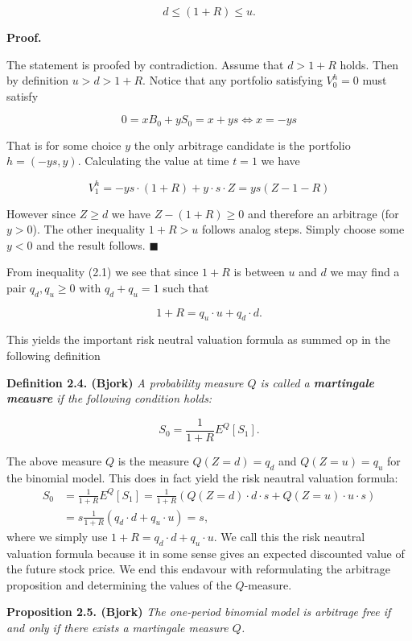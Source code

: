 \documentclass[
]{book}
\begin{document}
\[d\le (1+R)\le u.\tag{2.1}\]

\noindent\makebox[\linewidth]{\rule{\textwidth}{0.4pt}}

\textbf{Proof.}

The statement is proofed by contradiction. Assume that \(d>1+R\) holds. Then by definition \(u>d>1+R\). Notice that any portfolio satisfying \(V_0^h=0\) must satisfy

\[0=xB_0+yS_0=x+ys\iff x=-ys\]

That is for some choice \(y\) the only arbitrage candidate is the portfolio \(h=(-ys,y)\). Calculating the value at time \(t=1\) we have

\[V_1^h=-ys\cdot(1+R)+y\cdot s\cdot Z=ys(Z-1-R)\]

However since \(Z\ge d\) we have \(Z-(1+R)\ge 0\) and therefore an arbitrage (for \(y>0\)). The other inequality \(1+R>u\) follows analog steps. Simply choose some \(y<0\) and the result follows. \(\blacksquare\)

\noindent\makebox[\linewidth]{\rule{\textwidth}{0.4pt}}
From inequality (2.1) we see that since \(1+R\) is between \(u\) and \(d\) we may find a pair \(q_d,q_u\ge 0\) with \(q_d+q_u=1\) such that

\[1+R=q_u\cdot u+q_d\cdot d.\]

This yields the important risk neutral valuation formula as summed op in the following definition

\textbf{Definition 2.4. (Bjork)} \emph{A probability measure \(Q\) is called a \textbf{martingale meausre} if the following condition holds:}

\[S_0=\frac{1}{1+R}E^Q[S_1].\]

The above measure \(Q\) is the measure \(Q(Z=d)=q_d\) and \(Q(Z=u)=q_u\) for the binomial model. This does in fact yield the risk neautral valuation formula:
\begin{align*}
S_0&=\frac{1}{1+R}E^Q[S_1]=\frac{1}{1+R}(Q(Z=d)\cdot d\cdot s+Q(Z=u)\cdot u\cdot s)\\
&=s\frac{1}{1+R}(q_d\cdot d+q_u\cdot u)=s,
\end{align*}
where we simply use \(1+R=q_d\cdot d+q_u\cdot u\). We call this the risk neautral valuation formula because it in some sense gives an expected discounted value of the future stock price. We end this endavour with reformulating the arbitrage proposition and determining the values of the \(Q\)-measure.

\textbf{Proposition 2.5. (Bjork)} \emph{The one-period binomial model is arbitrage free if and only if there exists a martingale measure \(Q\).}
\end{document}
